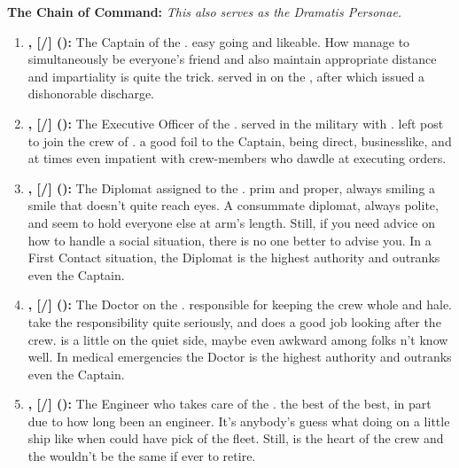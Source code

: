 \documentclass[blue]{TMFHope}
\begin{document}
{\bf The \pNew{} Chain of Command:} \emph{This also serves as the Dramatis Personae.}
\begin{enumerate}
  \item \textbf{\cCap{\full}, [\cCap{\they}/\cCap{\them}] (\cCap{\MYplayer}):} The Captain of the \pNew{}. \cCap{\They} \cCap{\are} easy going and likeable. How \cCap{\they} manage\cCap{\plural} to simultaneously be everyone's friend and also maintain appropriate distance and impartiality is quite the trick. \cCap{\They} served in \pBattle{} on the \pOld{}, after which \cCap{\they} \cCap{\were} issued a dishonorable discharge.
  
  \item \textbf{\cXO{\full}, [\cXO{\they}/\cXO{\them}] (\cXO{\MYplayer}):} The Executive Officer of the \pNew{}. \cXO{} served in the \pPlan{} military with \cCap{}. \cXO{\They} left \cXO{\their} post to join the crew of \pNew{}. \cXO{\They} \cXO{\are} a good foil to the Captain, being direct, businesslike, and at times even impatient with crew-members who dawdle at executing orders.
  
  \item \textbf{\cDip{\full}, [\cDip{\they}/\cDip{\them}] (\cDip{\MYplayer}):} The Diplomat assigned to the \pNew{}. \cDip{\They} \cDip{\are} prim and proper, always smiling a smile that doesn't quite reach \cDip{\their} eyes. A consummate diplomat, \cDip{\they} \cDip{\are} always polite, and seem\cDip{\plural} to hold everyone else at arm's length. Still, if you need advice on how to handle a social situation, there is no one better to advise you. In a First Contact situation, the Diplomat is the highest authority and outranks even the Captain.
  
  \item \textbf{\cMed{\full}, [\cMed{\they}/\cMed{\them}] (\cMed{\MYplayer}):} The Doctor on the  \pNew{}. \cMed{\They} \cMed{\are} responsible for keeping the crew whole and hale. \cMed{\They} take\cMed{\plural} the responsibility quite seriously, and does a good job looking after the crew. \cMed{} is a little on the quiet side, maybe even awkward among folks \cMed{\they} \cMed{\does}n't know well. In medical emergencies the Doctor is the highest authority and outranks even the Captain.
  
  \item \textbf{\cEng{\full}, [\cEng{\they}/\cEng{\them}] (\cEng{\MYplayer}):} The Engineer who takes care of the \pNew{}. \cEng{\They} \cEng{\are} the best of the best, in part due to how long \cEng{\they} \cEng{\have} been an engineer. It's anybody's guess what \cEng{\they} \cEng{\are} doing on a little ship like \pNew{} when \cEng{\they} could have \cEng{\their} pick of the fleet. Still, \cEng{} is the heart of the crew and the \pNew{} wouldn't be the same if \cEng{\they} \cEng{\were} ever to retire.
  

\end{enumerate}
\end{document}
